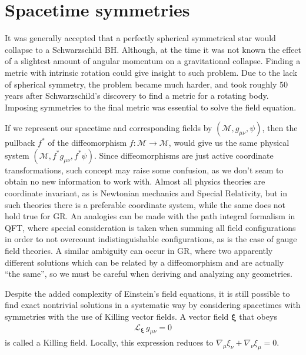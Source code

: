 \section{Spacetime symmetries}

It was generally accepted that a perfectly spherical symmetrical star would collapse to a Schwarzschild BH. 
Although, at the time it was not known the effect of a slightest amount of angular momentum on a gravitational collapse.
Finding a metric with intrinsic rotation could give insight to such problem. Due to the lack of spherical symmetry, the problem became much harder, and took roughly 50 years after Schwarzschild's discovery to find a metric for a rotating body.
Imposing symmetries to the final metric was essential to solve the field equation.

If we represent our spacetime and corresponding fields by $(\mathscr{M}, g_{\mu\nu}, \psi)$, then the pullback $f^*$ of the diffeomorphism $f:\mathscr{M}\rightarrow\mathscr{M}$, would give us the same physical system $(\mathscr{M}, f^* g_{\mu\nu}, f^* \psi)$.
Since diffeomorphisms are just active coordinate transformations, such concept may raise some confusion, as we don't seam to obtain no new information to work with. 
Almost all physics theories are coordinate invariant, as is Newtonian mechanics and Special Relativity, but in such theories there is a preferable coordinate system, while the same does not hold true for GR.
An analogies can be made with the path integral formalism in QFT, where special consideration is taken when summing all field configurations in order to not overcount indistinguishable configurations, as is the case of gauge field theories.
A similar ambiguity can occur in GR, where two apparently different solutions which can be related by a diffeomorphism and are actually ``the same'', so we must be careful when deriving and analyzing any geometries.

Despite the added complexity of Einstein's field equations, it is still possible to find exact nontrivial solutions in a systematic way by considering spacetimes with symmetries with the use of Killing vector fields.
A vector field $\bm{\xi}$ that obeys
\begin{align}
    \mathscr{L}_{\bm{\xi}} \,g_{\mu\nu} = 0  
    \label{eq2:killing}
\end{align}
is called a Killing field. Locally, this expression reduces to $\nabla_\mu \xi_\nu + \nabla_\nu \xi_\mu = 0$.

